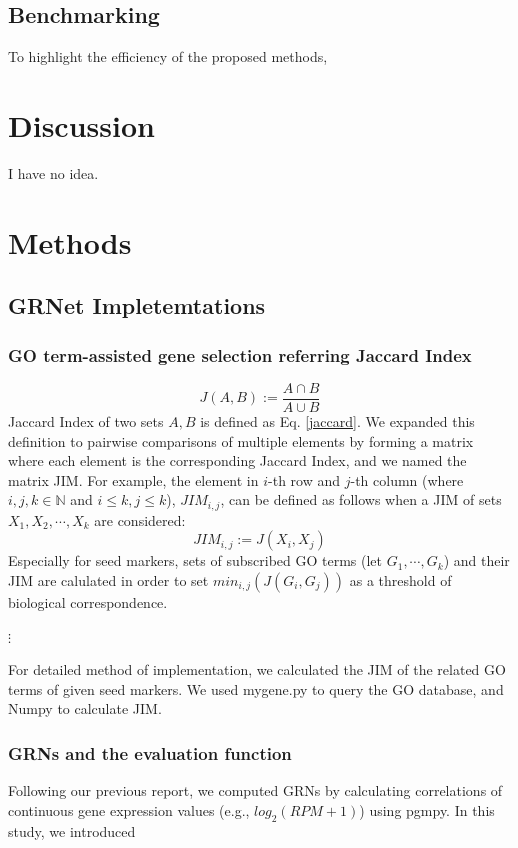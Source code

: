 \documentclass{article}
\begin{document}
\subsection*{Benchmarking}
To highlight the efficiency of the proposed methods, 

\section*{Discussion}
I have no idea.

\section*{Methods}
\subsection*{GRNet Impletemtations}

\subsubsection*{GO term-assisted gene selection referring Jaccard Index}
\begin{equation}\label{jaccard}
  J(A, B) := \frac{A\cap B}{A\cup B}
\end{equation}
Jaccard Index of two sets $A, B$ is defined as Eq. \eqref{jaccard}. We expanded this 
definition to pairwise comparisons of multiple elements by forming a matrix 
where each element is the corresponding Jaccard Index, and we named the matrix \ac{JIM}. For example, the element in 
$i$-th row and $j$-th column (where $i, j, k\in\mathbb{N}$ and $i\leq k, j\leq k$), $JIM_{i,j}$, can be defined as
follows when a JIM of sets $X_1, X_2,\cdots, X_k$ are considered:
\begin{equation}\label{jim}
  JIM_{i, j} := J(X_i, X_j)
\end{equation}
Especially for seed markers, sets of subscribed GO terms (let $G_1, \cdots, G_k$)
and their JIM are calulated in order to set $min_{i,j}(J(G_i, G_j))$ as a threshold of 
biological correspondence.

$\vdots$

For detailed method of implementation, we calculated the JIM of the related GO terms of given seed markers. We used mygene.py\cite{mygene} to query the GO database, and Numpy\cite{numpy} to calculate JIM.

\subsubsection*{GRNs and the evaluation function}
Following our previous report\cite{okano2023set}, we computed GRNs by calculating
correlations of continuous gene expression values (e.g., $log_2(RPM+1)$) using pgmpy. In this study, we introduced
\end{document}
